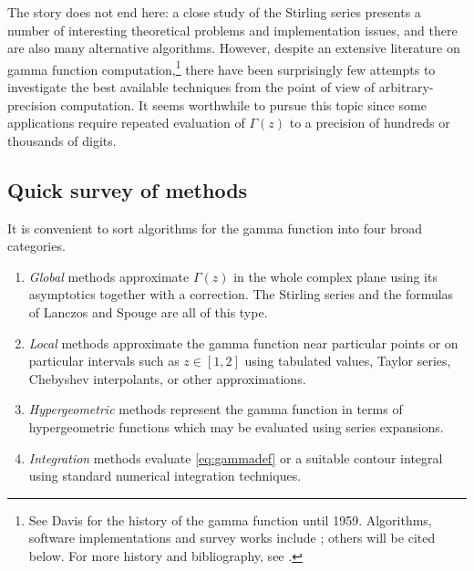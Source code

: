 \documentclass[reqno]{amsart}
\theoremstyle{definition}
\begin{document}
The story does not end here: a close study of the Stirling series
presents a number of
interesting theoretical problems and implementation issues, and
there are also many alternative algorithms.
However, despite an extensive literature on gamma function computation,\footnote{See Davis \cite{Davis1959} for the history of the gamma function until 1959.
Algorithms, software implementations and survey works include \cite{hastings1955approximations,Lanczos1964,Cody1967,Filho1967,luke1969special,Luke1970,Kuki1972,Klbig1972,Ng1975,Brent1978,van1984calculation,Borwein1987,Macleod1989,BorweinZucker1992,Cody1991,Cody1993,Spouge1994,Hare1997,Smith2001,laurie2005,Fousse2007,schmelzer2007computing,cuyt2008handbook,Johansson2014thesis,beebe2017mathematical}; others will be cited below. For more history and bibliography, see \cite{sebah2002introduction,Borwein2018,Olver:2010:NHMF,perez2020notes}.}
there have been surprisingly few
attempts to investigate the best available techniques
from the point of view of arbitrary-precision computation.
It seems worthwhile to pursue this topic
since some applications require repeated
evaluation of $\Gamma(z)$ to
a precision of hundreds or thousands of digits.

\subsection{Quick survey of methods}

It is convenient to sort algorithms for the gamma function
into four broad categories.
\begin{enumerate}
\item \emph{Global} methods approximate $\Gamma(z)$ in the whole complex plane
using its asymptotics
together with a correction.
The Stirling series
and the formulas of Lanczos \cite{Lanczos1964} and Spouge \cite{Spouge1994}
are all of this type. %
\item \emph{Local} methods approximate the gamma function near particular
points or on particular intervals such as $z \in [1, 2]$ using tabulated values,
Taylor series,
Chebyshev interpolants, or other approximations. %
\item \emph{Hypergeometric} methods represent the gamma function
in terms of hypergeometric functions which may be
evaluated using series expansions.
\item \emph{Integration} methods evaluate \eqref{eq:gammadef}
or a suitable contour integral using standard numerical integration
techniques. %
\end{enumerate}
\end{document}
